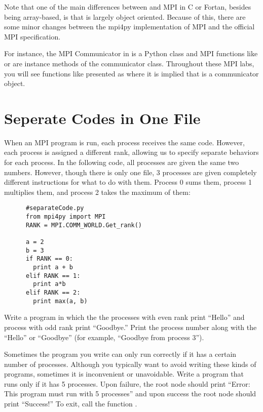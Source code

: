     Note that one of the main differences between  and MPI in C or Fortan, besides being array-based, is that  is largely object oriented. Because of this, there are some minor changes between the mpi4py implementation of MPI and the official MPI specification.
    
    For instance, the MPI Communicator in  is a Python class and MPI functions like  or  are instance methods of the communicator class. Throughout these MPI labs, you will see functions like  presented as  where it is implied that  is a communicator object.

  \section*{Seperate Codes in One File}
    When an MPI program is run, each process receives the same code. However, each process is assigned a different rank, allowing us to specify separate behaviors for each process. In the following code, all processes are given the same two numbers. However, though there is only one file, 3 processes are given completely different instructions for what to do with them. Process 0 sums them, process 1 multiplies them, and process 2 takes the maximum of them:

    \begin{lstlisting}
      #separateCode.py
      from mpi4py import MPI
      RANK = MPI.COMM_WORLD.Get_rank()

      a = 2
      b = 3
      if RANK == 0:
        print a + b
      elif RANK == 1:
        print a*b
      elif RANK == 2:
        print max(a, b)
    \end{lstlisting}

    \begin{problem}
        Write a program in which the the processes with even rank print ``Hello'' and process with odd rank print ``Goodbye.'' Print the process number along with the ``Hello'' or ``Goodbye'' (for example, ``Goodbye from process 3'').
    \end{problem}

    \begin{problem}
      Sometimes the program you write can only run correctly if it has a certain number of processes. Although you typically want to avoid writing these kinds of programs, sometimes it is inconvenient or unavoidable. Write a program that runs only if it has 5 processes. Upon failure, the root node should print ``Error: This program must run with 5 processes'' and upon success the root node should print ``Success!'' To exit, call the function .
    \end{problem}
